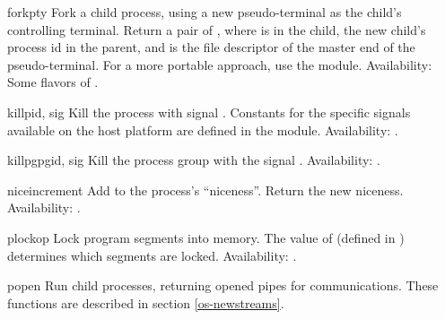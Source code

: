 \begin{funcdesc}{forkpty}{}
Fork a child process, using a new pseudo-terminal as the child's
controlling terminal. Return a pair of ,
where  is  in the child, the new child's process id
in the parent, and  is the file descriptor of the master end
of the pseudo-terminal.  For a more portable approach, use the
 module.
Availability: Some flavors of \UNIX.
\end{funcdesc}

\begin{funcdesc}{kill}{pid, sig}
Kill the process  with signal .  Constants for the
specific signals available on the host platform are defined in the
 module.
Availability: \UNIX.
\end{funcdesc}

\begin{funcdesc}{killpg}{pgid, sig}
Kill the process group  with the signal .
Availability: \UNIX.
\end{funcdesc}

\begin{funcdesc}{nice}{increment}
Add  to the process's ``niceness''.  Return the new
niceness.
Availability: \UNIX.
\end{funcdesc}

\begin{funcdesc}{plock}{op}
Lock program segments into memory.  The value of 
(defined in ) determines which segments are locked.
Availability: \UNIX.
\end{funcdesc}

\begin{funcdescni}{popen}{\unspecified}
Run child processes, returning opened pipes for communications.  These
functions are described in section \ref{os-newstreams}.
\end{funcdescni}

